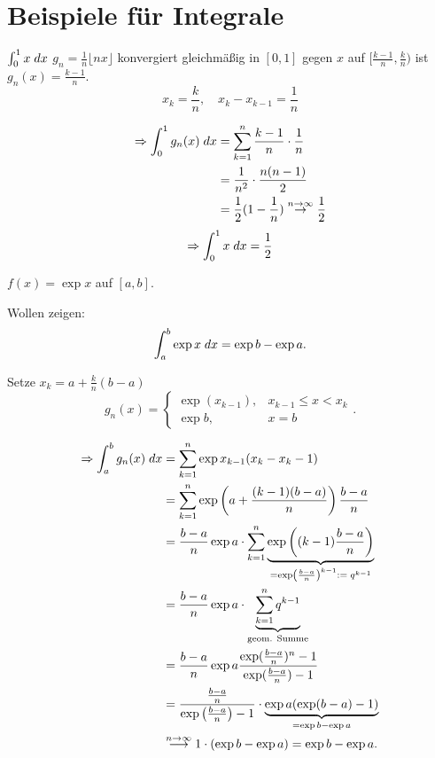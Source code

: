 \documentclass[../ana2u.tex]{subfiles}
\begin{document}
\setcounter{section}{1}

\section{Beispiele für Integrale}
\begin{bsp}
    \( \integral{x}{0}{1} \) 
    \( g_n = \frac{1}{n} \lfloor nx \rfloor \) 
    konvergiert gleichmäßig in \( [0,1] \)
    gegen \(x\) auf \( [\frac{ k-1 }{n}, \frac{k}{n}) \)
    ist \( g_n(x) = \frac{k-1}{n} \).
    \[ x_k = \frac{k}{n},
    \quad x_k - x_{k-1} = \frac{1}{n} \]

    \begin{align*}
        \Rightarrow \integral{g_n(x)}{0}{1}
        &= \sum_{k=1}^n \frac{k-1}{n} \cdot \frac{1}{n}\\
        &= \frac{1}{n^2} \cdot \frac{n(n-1)}{2} \\
        &= \frac{1}{2} (1-\frac{1}{n}) 
        \overset{n\rightarrow \infty}{\rightarrow} 
        \frac{1}{2}
    \end{align*}
    \[ \Rightarrow \integral{x}{0}{1} = \frac{1}{2} \]
\end{bsp}
\begin{bsp}
    \begin{beh}
        \( f(x) = \exp x \) auf \( [a,b] \).
    \end{beh}    
    Wollen zeigen:
    \[ \integral{\exp x}{a}{b} = \exp b - \exp a. \]
    \begin{bew}
        Setze \( x_k = a + \frac{k}{n} (b-a) \)
        \[ g_n(x) = \begin{cases}
            \exp(x_{k-1}), &x_{k-1} \leq x < x_k\\
            \exp b, &x = b
        \end{cases}. \]
        
        \begin{align*}
            \Rightarrow \integral{g_n(x)}{a}{b} 
            &= \sum_{k=1}^n \exp x_{k-1}(x_k-x_k-1)\\
            &= \sum_{k=1}^n 
            \exp\left(a + \frac{(k-1)(b-a)}{n}\right)
            \frac{b-a}{n}\\
            &= \frac{b-a}{n} \exp a \cdot 
            \sum_{k=1}^n \underbrace{\exp \left( (k-1) \frac{b-a}{n} \right)}_
            {= \exp \left( \frac{b-a}{n} \right)^{k-1} := \;q^{k-1}}\\
            &= \frac{b-a}{n} \exp a \cdot 
            \underbrace{\sum_{k=1}^n q^{k-1} }_{\text{geom. Summe}}\\
            &= \frac{ b-a }{n} \exp a 
            \frac{ \exp(\frac{b-a}{n})^n - 1}{ \exp(\frac{b-a}{n}) - 1 }\\
            &= \frac{\frac{b-a}{n}}{\exp \left( \frac{b-a}{n} \right) - 1}
            \cdot \underbrace{\exp a (\exp(b-a) - 1)}_{=\exp b - \exp a}\\
            &\overset{n \rightarrow \infty}{\longrightarrow} 
            1 \cdot (\exp b - \exp a) = \exp b - \exp a.
        \end{align*}
    \end{bew}
\end{bsp}
\end{document}
